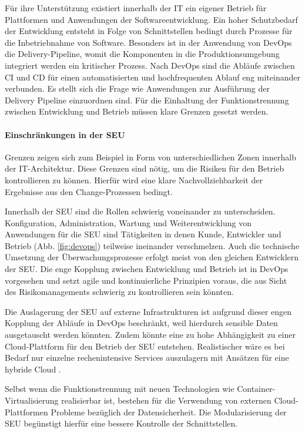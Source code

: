 Für ihre Unterstützung existiert innerhalb der IT ein eigener Betrieb für Plattformen und Anwendungen der Softwareentwicklung. Ein hoher Schutzbedarf der Entwicklung entsteht in Folge von Schnittstellen bedingt durch Prozesse für die Inbetriebnahme von Software. Besonders ist in der Anwendung von DevOps die Delivery-Pipeline, womit die Komponenten in die Produktionsumgebung integriert werden ein kritischer Prozess. Nach DevOps sind die Abläufe zwischen \ac{CI} und \ac{CD} für einen automatisierten und hochfrequenten Ablauf eng miteinander verbunden. 
Es stellt sich die Frage wie Anwendungen zur Ausführung der Delivery Pipeline einzuordnen sind. Für die Einhaltung der Funktionstrennung \cite{MaRisk:2017} zwischen Entwicklung und Betrieb müssen klare Grenzen gesetzt werden. 

\paragraph{Einschränkungen in der SEU}
Grenzen zeigen sich zum Beispiel in Form von unterschiedlichen Zonen innerhalb der IT-Architektur. 
Diese Grenzen sind nötig, um die Risiken für den Betrieb kontrollieren zu können. Hierfür wird eine klare Nachvollziehbarkeit der Ergebnisse aus den Change-Prozessen bedingt.

Innerhalb der \ac{SEU} sind die Rollen schwierig voneinander zu unterscheiden. Konfiguration, Administration, Wartung und Weiterentwicklung von Anwendungen für die \ac{SEU} sind Tätigkeiten in denen Kunde, Entwickler und Betrieb (Abb. \ref{fig:devops}) teilweise ineinander verschmelzen. Auch die technische Umsetzung der Überwachungsprozesse erfolgt meist von den gleichen Entwicklern der \ac{SEU}. 
Die enge Kopplung zwischen Entwicklung und Betrieb ist in DevOps vorgesehen \cite{} und setzt agile und kontinuierliche Prinzipien voraus, die aus Sicht des Risikomanagements schwierig zu kontrollieren sein könnten. 

Die Auslagerung der \ac{SEU} auf externe Infrastrukturen ist aufgrund dieser engen Kopplung der Abläufe in DevOps beschränkt, weil hierdurch sensible Daten ausgetauscht werden könnten. Zudem könnte eine zu hohe Abhängigkeit zu einer Cloud-Plattform für den Betrieb der \ac{SEU} entstehen. Realistischer wäre es bei Bedarf nur einzelne rechenintensive Services auszulagern mit Ansätzen für eine hybride Cloud \cite{Gupta:2017}. 

Selbst wenn die Funktionstrennung mit neuen Technologien wie Container-Virtualisierung realisierbar ist, bestehen für die Verwendung von externen Cloud-Plattformen Probleme bezüglich der Datensicherheit. Die Modularisierung der \ac{SEU} begünstigt hierfür eine bessere Kontrolle der Schnittstellen. 

